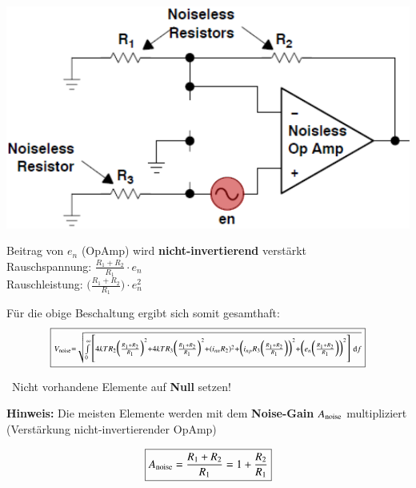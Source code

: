 \begin{minipage}[c]{0.4\columnwidth}
    \includegraphics[width=\columnwidth]{images/rauschen_opamp_en.png}
\end{minipage}
\hfill
\begin{minipage}[c]{0.4\columnwidth}
    Beitrag von $e_n$ (OpAmp) wird \textbf{nicht-invertierend} verstärkt \\

    Rauschspannung: $ \frac{R_1 + R_2}{R_1} \cdot e_n$ \\
    Rauschleistung: $ \bigl(\frac{R_1 + R_2}{R_1} \bigr) \cdot e_n^2$
\end{minipage}

\vspace{0.2cm}
Für die obige Beschaltung ergibt sich somit gesamthaft:
$$ \boxed{ \scriptstyle{  V_{\rm noise} = \sqrt{ \int\limits_{0}^{\infty} \,  \Biggl[
    4 k T R_2 \Bigl( \frac{R_1 + R_2}{R_1} \Bigr)^2 + 4 k T R_3 \Bigl( \frac{R_1 + R_2}{R_1} \Bigr)^2
    + (i_{nn} R_2 )^2 + \Bigl(  i_{np} R_3 \Bigl( \frac{R_1 + R_2}{R_1} \Bigr) \Bigr)^2
    +  \Bigl(  e_n \Bigl( \frac{R_1 + R_2}{R_1} \Bigr) \Bigr)^2
    \Biggr] \, \ensuremath{\mathop{} \! \mathrm{d}}f } }} $$

\textrightarrow\ Nicht vorhandene Elemente auf \textbf{Null} setzen!

\vspace{0.2cm}
\begin{minipage}[c]{0.48\columnwidth}
    \textbf{Hinweis:} Die meisten Elemente werden mit dem \textbf{Noise-Gain} $A_{\rm noise}$ multipliziert 
    (Verstärkung nicht-invertierender OpAmp)
\end{minipage}
\hfill
\begin{minipage}[c]{0.48\columnwidth}
    $$ \boxed{ A_{\rm noise} = \frac{R_1 + R_2}{R_1} = 1 + \frac{R_2}{R_1}}$$
\end{minipage}


